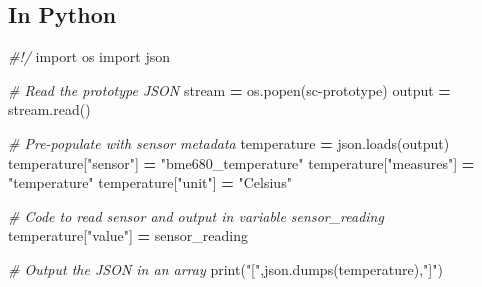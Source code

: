 \documentclass[
]{book}
\newenvironment{Shaded}{\begin{snugshade}}{\end{snugshade}}
\newcommand{\AttributeTok}[1]{\textcolor[rgb]{0.13,0.29,0.53}{#1}}
\newcommand{\BuiltInTok}[1]{#1}
\newcommand{\CommentTok}[1]{\textcolor[rgb]{0.56,0.35,0.01}{\textit{#1}}}
\newcommand{\DataTypeTok}[1]{\textcolor[rgb]{0.13,0.29,0.53}{#1}}
\newcommand{\ExtensionTok}[1]{#1}
\newcommand{\ImportTok}[1]{#1}
\newcommand{\KeywordTok}[1]{\textcolor[rgb]{0.13,0.29,0.53}{\textbf{#1}}}
\newcommand{\NormalTok}[1]{#1}
\newcommand{\OperatorTok}[1]{\textcolor[rgb]{0.81,0.36,0.00}{\textbf{#1}}}
\newcommand{\StringTok}[1]{\textcolor[rgb]{0.31,0.60,0.02}{#1}}
\newcommand{\VariableTok}[1]{\textcolor[rgb]{0.00,0.00,0.00}{#1}}
\begin{document}
\begin{Shaded}
\end{Shaded}

\hypertarget{in-python}{%
\subsection{In Python}\label{in-python}}

\begin{Shaded}
\begin{Highlighting}[]
\CommentTok{\#!/}
\ImportTok{import}\NormalTok{ os}
\ImportTok{import}\NormalTok{ json}

\CommentTok{\# Read the prototype JSON}
\NormalTok{stream }\OperatorTok{=}\NormalTok{ os.popen(}\StringTok{\textquotesingle{}sc{-}prototype\textquotesingle{}}\NormalTok{)}
\NormalTok{output }\OperatorTok{=}\NormalTok{ stream.read()}

\CommentTok{\# Pre{-}populate with sensor metadata}
\NormalTok{temperature }\OperatorTok{=}\NormalTok{ json.loads(output)}
\NormalTok{temperature[}\StringTok{"sensor"}\NormalTok{] }\OperatorTok{=} \StringTok{"bme680\_temperature"}
\NormalTok{temperature[}\StringTok{"measures"}\NormalTok{] }\OperatorTok{=} \StringTok{"temperature"}
\NormalTok{temperature[}\StringTok{"unit"}\NormalTok{] }\OperatorTok{=} \StringTok{"Celsius"}

\CommentTok{\# Code to read sensor and output in variable \textasciigrave{}sensor\_reading\textasciigrave{}}
\NormalTok{temperature[}\StringTok{"value"}\NormalTok{] }\OperatorTok{=}\NormalTok{ sensor\_reading}

\CommentTok{\# Output the JSON in an array}
\BuiltInTok{print}\NormalTok{(}\StringTok{"["}\NormalTok{,json.dumps(temperature),}\StringTok{"]"}\NormalTok{)}
\end{Highlighting}
\end{Shaded}
\end{document}
